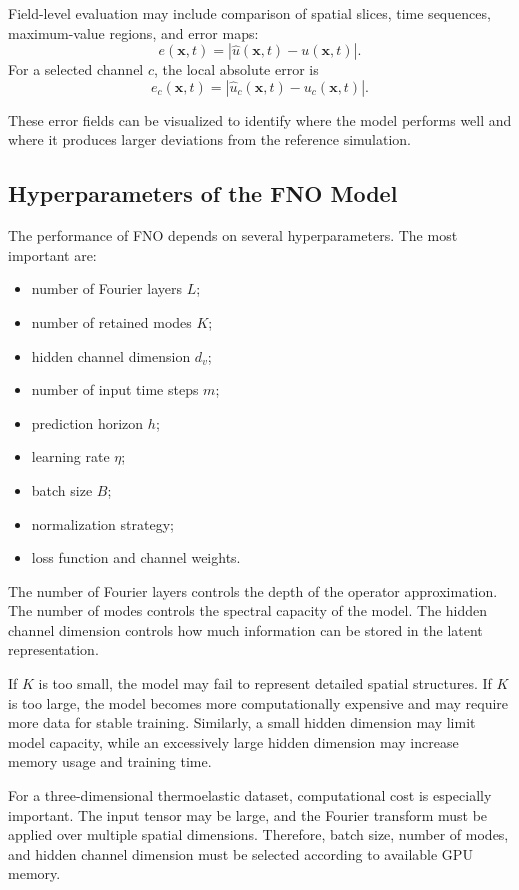 \documentclass[14pt]{extarticle}
\begin{document}
Field-level evaluation may include comparison of spatial slices, time sequences, maximum-value regions, and error maps:
\[
e(\mathbf{x}, t)
=
\left|
\hat{u}(\mathbf{x}, t)
-
u(\mathbf{x}, t)
\right|.
\]
For a selected channel \(c\), the local absolute error is
\[
e_c(\mathbf{x}, t)
=
\left|
\hat{u}_c(\mathbf{x}, t)
-
u_c(\mathbf{x}, t)
\right|.
\]

These error fields can be visualized to identify where the model performs well and where it produces larger deviations from the reference simulation.

\subsection{Hyperparameters of the FNO Model}

The performance of FNO depends on several hyperparameters. The most important are:

\begin{itemize}
    \item number of Fourier layers \(L\);
    \item number of retained modes \(K\);
    \item hidden channel dimension \(d_v\);
    \item number of input time steps \(m\);
    \item prediction horizon \(h\);
    \item learning rate \(\eta\);
    \item batch size \(B\);
    \item normalization strategy;
    \item loss function and channel weights.
\end{itemize}

The number of Fourier layers controls the depth of the operator approximation. The number of modes controls the spectral capacity of the model. The hidden channel dimension controls how much information can be stored in the latent representation.

If \(K\) is too small, the model may fail to represent detailed spatial structures. If \(K\) is too large, the model becomes more computationally expensive and may require more data for stable training. Similarly, a small hidden dimension may limit model capacity, while an excessively large hidden dimension may increase memory usage and training time.

For a three-dimensional thermoelastic dataset, computational cost is especially important. The input tensor may be large, and the Fourier transform must be applied over multiple spatial dimensions. Therefore, batch size, number of modes, and hidden channel dimension must be selected according to available GPU memory.
\end{document}
